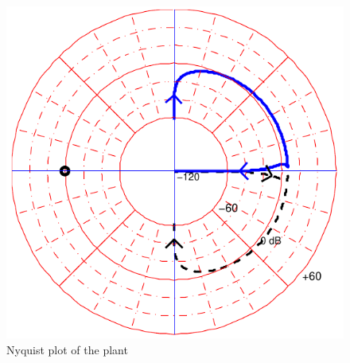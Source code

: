 \begin{figure}[H] 
	\centering 
	\includegraphics[scale=0.6]{figures/nyquistCubli}	
	\caption{Nyquist plot of the plant}
	\label{nyquistCubli}
\end{figure}
